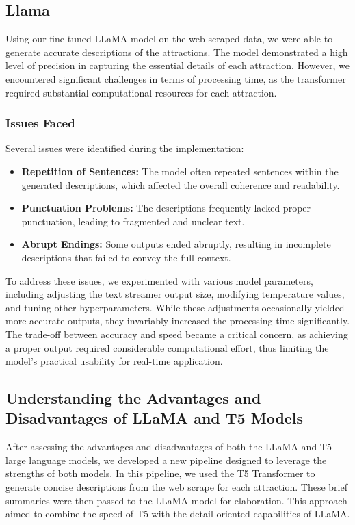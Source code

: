 \documentclass[conference]{IEEEtran}
\begin{document}
    \subsection{Llama}

        Using our fine-tuned LLaMA model on the web-scraped data, we were able to generate accurate descriptions of the attractions. The model demonstrated a high level of precision in capturing the essential details of each attraction. However, we encountered significant challenges in terms of processing time, as the transformer required substantial computational resources for each attraction.

        \subsubsection{Issues Faced}
            Several issues were identified during the implementation:
            \begin{itemize}
                \item \textbf{Repetition of Sentences:} The model often repeated sentences within the generated descriptions, which affected the overall coherence and readability.
                \item \textbf{Punctuation Problems:} The descriptions frequently lacked proper punctuation, leading to fragmented and unclear text.
                \item \textbf{Abrupt Endings:} Some outputs ended abruptly, resulting in incomplete descriptions that failed to convey the full context.
            \end{itemize}

            To address these issues, we experimented with various model parameters, including adjusting the text streamer output size, modifying temperature values, and tuning other hyperparameters. While these adjustments occasionally yielded more accurate outputs, they invariably increased the processing time significantly. The trade-off between accuracy and speed became a critical concern, as achieving a proper output required considerable computational effort, thus limiting the model's practical usability for real-time application.

    \subsection{Understanding the Advantages and Disadvantages of LLaMA and T5 Models}

        After assessing the advantages and disadvantages of both the LLaMA and T5 large language models, we developed a new pipeline designed to leverage the strengths of both models. In this pipeline, we used the T5 Transformer to generate concise descriptions from the web scrape for each attraction. These brief summaries were then passed to the LLaMA model for elaboration. This approach aimed to combine the speed of T5 with the detail-oriented capabilities of LLaMA.
\end{document}
